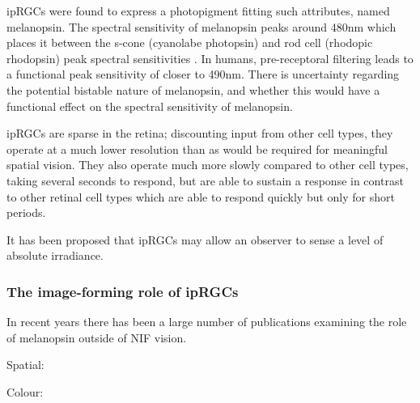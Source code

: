 \Glspl{ipRGC} were found to express a photopigment fitting such attributes, named melanopsin. The spectral sensitivity of melanopsin peaks around 480nm\citep{qiu_induction_2005,hankins_primary_2002,dacey_melanopsin-expressing_2005,peirson_melanopsin_2006,bailes_human_2013} which places it between the s-cone (cyanolabe photopsin) and rod cell (rhodopic rhodopsin) peak spectral sensitivities%
. In humans, pre-receptoral filtering leads to a functional peak sensitivity of closer to 490nm\citep{cie_cie_2015-1}. There is uncertainty regarding the potential bistable nature of melanopsin, and whether this would have a functional effect on the spectral sensitivity of melanopsin\citep{cie_cie_2015-1,mure_melanopsin_2009,rollag_does_2008}.

\Glspl{ipRGC} are sparse in the retina; discounting input from other cell types, they operate at a much lower resolution than as would be required for meaningful spatial vision. They also operate much more slowly compared to other cell types, taking several seconds to respond, but are able to sustain a response in contrast to other retinal cell types which are able to respond quickly but only for short periods.

It has been proposed that \glspl{ipRGC} may allow an observer to sense a level of absolute irradiance\citep{brown_melanopsin_2010}. 

\subsubsection{The image-forming role of ipRGCs}

In recent years there has been a large number of publications examining the role of melanopsin outside of \gls{NIF} vision.

Spatial:
\cite{ecker_melanopsin-expressing_2010}
\cite{spitschan_vision_2017}
\cite{mouland_responses_2017}
\cite{allen_melanopsin_2017}
\cite{allen_form_2019}

Colour:
\cite{cao_evidence_2018}
\cite{spitschan_human_2017-1}
\cite{zele_melanopsin_2018}